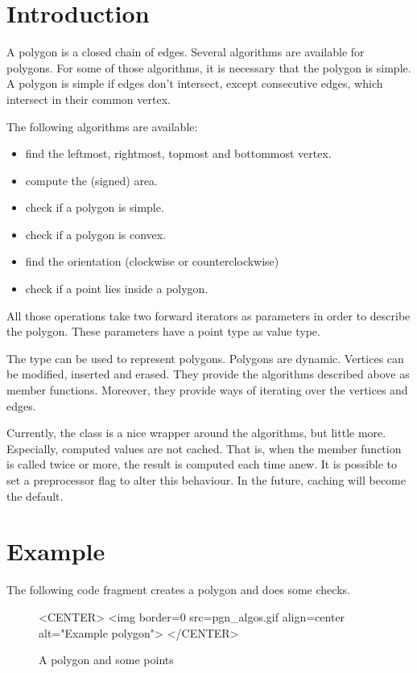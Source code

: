 


\section{Introduction}

A polygon is a closed chain of edges. Several algorithms are available for
polygons. For some of those algorithms, it is necessary that the polygon is
simple. A polygon is simple if edges don't intersect, except consecutive edges,
which intersect in their common vertex.

The following algorithms are available:
\begin{itemize}
\item find the leftmost, rightmost, topmost and bottommost vertex.
\item compute the (signed) area.
\item check if a polygon is simple.
\item check if a polygon is convex.
\item find the orientation (clockwise or counterclockwise)
\item check if a point lies inside a polygon.
\end{itemize}
All those operations take two forward iterators as parameters in order to
describe the polygon. These parameters have a point type as value type.

The type  can be used to represent polygons.
Polygons are dynamic. Vertices can be modified, inserted and erased.
They provide the algorithms described above as member functions.
Moreover, they provide ways of iterating over the vertices and edges.

Currently, the  class is a nice wrapper around the algorithms,
but little more. Especially, computed values are not cached.
That is, when the  member function is called twice or more,
the result is computed each time anew. It is possible to set a preprocessor flag
to alter this behaviour. In the future, caching will become the default.

\section{Example}

The following code fragment creates a polygon and does some checks.




\begin{figure}
\begin{ccTexOnly}
\begin{center}   \end{center}
\end{ccTexOnly}
\caption{A polygon and some points
\label{I1_Fig_a_polygon}}
\begin{ccHtmlOnly}
<CENTER>
<img border=0 src=pgn_algos.gif align=center alt="Example polygon">
</CENTER>
\end{ccHtmlOnly}
\end{figure}

